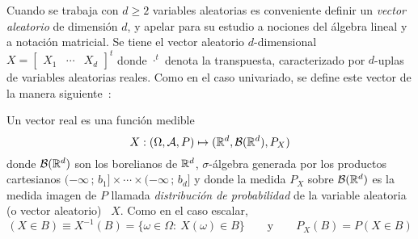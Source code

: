 Cuando se trabaja  con $d\geq 2$ variables aleatorias  es conveniente definir un
{\it vector aleatorio}  de dimensi\'on $d$, y apelar para  su estudio a nociones
del \'algebra  lineal y  a notaci\'on matricial.   Se tiene el  vector aleatorio
$d$-dimensional \ $X = \begin{bmatrix} X_1 & \cdots & X_d \end{bmatrix}^t$ donde
$\cdot^t$  denota  la  transpuesta,  caracterizado por  $d$-uplas  de  variables
aleatorias reales.   Como en  el caso  univariado, se define  este vector  de la
manera siguiente~\cite{AthLah06, Coh13, Bre88}:
%
\begin{definicion}
  Un vector real es una funci\'on medible
  \[
  X: (\Omega,\mathcal{A},P) \mapsto (\mathbb{R}^d,\mathcal{B}(\mathbb{R}^d),P_X)
  \]
  donde  $\mathcal{B}(\mathbb{R}^d)$  son  los  borelianos  de  $\mathbb{R}^d$,  $\sigma$-\'algebra
  generada por  los productos cartesianos $(-\infty  \, ; \,  b_1] \times \cdots
  \times (-\infty \,  ; \, b_d]$ y donde la medida  $P_X$ sobre $\mathcal{B}(\mathbb{R}^d)$ es
  la medida  imagen de  $P$ llamada {\it  distribuci\'on de probabilidad}  de la
  variable aleatoria (o vector aleatorio) \ $X$. Como en el caso escalar,
 \[
 (X \in B) \equiv X^{-1}(B) = \{ \omega \in \Omega: \: X(\omega) \in B \} \qquad
 \mbox{y} \qquad P_X(B) = P(X \in B)
 \]
\end{definicion}
%
\noindent  {}

\

